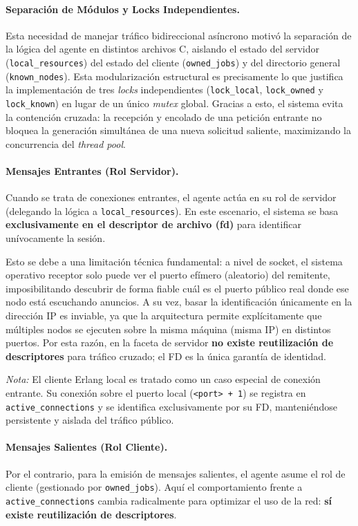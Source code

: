 \documentclass[12pt,a4paper]{article}
\begin{document}
\paragraph{Separación de Módulos y Locks Independientes.}
Esta necesidad de manejar tráfico bidireccional asíncrono motivó la separación de la lógica del agente en distintos archivos C, aislando el estado del servidor (\texttt{local\_resources}) del estado del cliente (\texttt{owned\_jobs}) y del directorio general (\texttt{known\_nodes}). Esta modularización estructural es precisamente lo que justifica la implementación de tres \emph{locks} independientes (\texttt{lock\_local}, \texttt{lock\_owned} y \texttt{lock\_known}) en lugar de un único \emph{mutex} global. Gracias a esto, el sistema evita la contención cruzada: la recepción y encolado de una petición entrante no bloquea la generación simultánea de una nueva solicitud saliente, maximizando la concurrencia del \emph{thread pool}.

\paragraph{Mensajes Entrantes (Rol Servidor).}
Cuando se trata de conexiones entrantes, el agente actúa en su rol de servidor (delegando la lógica a \texttt{local\_resources}). En este escenario, el sistema se basa \textbf{exclusivamente en el descriptor de archivo (fd)} para identificar unívocamente la sesión. 

Esto se debe a una limitación técnica fundamental: a nivel de socket, el sistema operativo receptor solo puede ver el puerto efímero (aleatorio) del remitente, imposibilitando descubrir de forma fiable cuál es el puerto público real donde ese nodo está escuchando anuncios. A su vez, basar la identificación únicamente en la dirección IP es inviable, ya que la arquitectura permite explícitamente que múltiples nodos se ejecuten sobre la misma máquina (misma IP) en distintos puertos. Por esta razón, en la faceta de servidor \textbf{no existe reutilización de descriptores} para tráfico cruzado; el FD es la única garantía de identidad. 

\emph{Nota:} El cliente Erlang local es tratado como un caso especial de conexión entrante. Su conexión sobre el puerto local (\texttt{<port> + 1}) se registra en \texttt{active\_connections} y se identifica exclusivamente por su FD, manteniéndose persistente y aislada del tráfico público.

\paragraph{Mensajes Salientes (Rol Cliente).}
Por el contrario, para la emisión de mensajes salientes, el agente asume el rol de cliente (gestionado por \texttt{owned\_jobs}). Aquí el comportamiento frente a \texttt{active\_connections} cambia radicalmente para optimizar el uso de la red: \textbf{sí existe reutilización de descriptores}.
\end{document}
